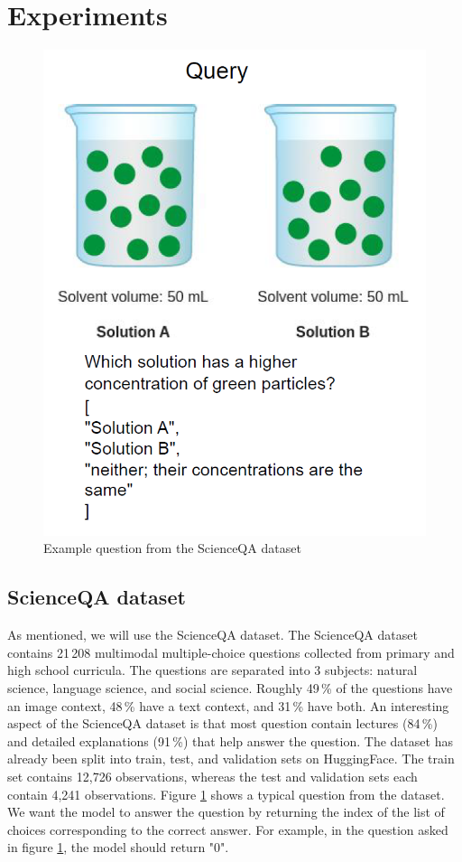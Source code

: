 \documentclass{article}
\begin{document}
\section{Experiments}
\label{sec:experiments}

\begin{figure}
  \centering
  \centerline{\includegraphics[scale=0.5]{example_question.png}}
  \caption{Example question from the ScienceQA dataset}
  \label{fig:example_q}
\end{figure}

\subsection{ScienceQA dataset}
As mentioned, we will use the ScienceQA dataset. The ScienceQA dataset contains 21\,208 multimodal multiple-choice questions collected from primary and high school curricula. The questions are separated into 3 subjects: natural science, language science, and social science. Roughly 49\,\% of the questions have an image context, 48\,\% have a text context, and 31\,\% have both. An interesting aspect of the ScienceQA dataset is that most question contain lectures (84\,\%) and detailed explanations (91\,\%) that help answer the question. The dataset has already been split into train, test, and validation sets on HuggingFace. The train set contains 12,726 observations, whereas the test and validation sets each contain 4,241 observations. Figure \ref{fig:example_q} shows a typical question from the dataset. We want the model to answer the question by returning the index of the list of choices corresponding to the correct answer. For example, in the question asked in figure \ref{fig:example_q}, the model should return "0".
\end{document}
